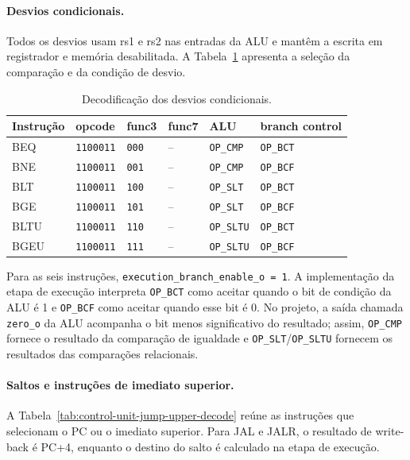 \paragraph{Desvios condicionais.}
Todos os desvios usam rs1 e rs2 nas entradas da ALU e mantêm a escrita em registrador e memória desabilitada. A Tabela~\ref{tab:control-unit-branch-decode} apresenta a seleção da comparação e da condição de desvio.

\begin{table}[!htb]
\centering
\caption{Decodificação dos desvios condicionais.}
\label{tab:control-unit-branch-decode}
\begin{tabular}{llllll}
\toprule
\textbf{Instrução} & \textbf{opcode} & \textbf{func3} & \textbf{func7} & \textbf{ALU} & \textbf{branch control} \\
\midrule
BEQ  & \texttt{1100011} & \texttt{000} & -- & \texttt{OP\_CMP}  & \texttt{OP\_BCT} \\
BNE  & \texttt{1100011} & \texttt{001} & -- & \texttt{OP\_CMP}  & \texttt{OP\_BCF} \\
BLT  & \texttt{1100011} & \texttt{100} & -- & \texttt{OP\_SLT}  & \texttt{OP\_BCT} \\
BGE  & \texttt{1100011} & \texttt{101} & -- & \texttt{OP\_SLT}  & \texttt{OP\_BCF} \\
BLTU & \texttt{1100011} & \texttt{110} & -- & \texttt{OP\_SLTU} & \texttt{OP\_BCT} \\
BGEU & \texttt{1100011} & \texttt{111} & -- & \texttt{OP\_SLTU} & \texttt{OP\_BCF} \\
\bottomrule
\end{tabular}
\end{table}

Para as seis instruções, \texttt{execution\_branch\_enable\_o = 1}. A implementação da etapa de execução interpreta \texttt{OP\_BCT} como aceitar quando o bit de condição da ALU é 1 e \texttt{OP\_BCF} como aceitar quando esse bit é 0. No projeto, a saída chamada \texttt{zero\_o} da ALU acompanha o bit menos significativo do resultado; assim, \texttt{OP\_CMP} fornece o resultado da comparação de igualdade e \texttt{OP\_SLT}/\texttt{OP\_SLTU} fornecem os resultados das comparações relacionais.

\paragraph{Saltos e instruções de imediato superior.}
A Tabela~\ref{tab:control-unit-jump-upper-decode} reúne as instruções que selecionam o PC ou o imediato superior. Para JAL e JALR, o resultado de write-back é PC+4, enquanto o destino do salto é calculado na etapa de execução.

